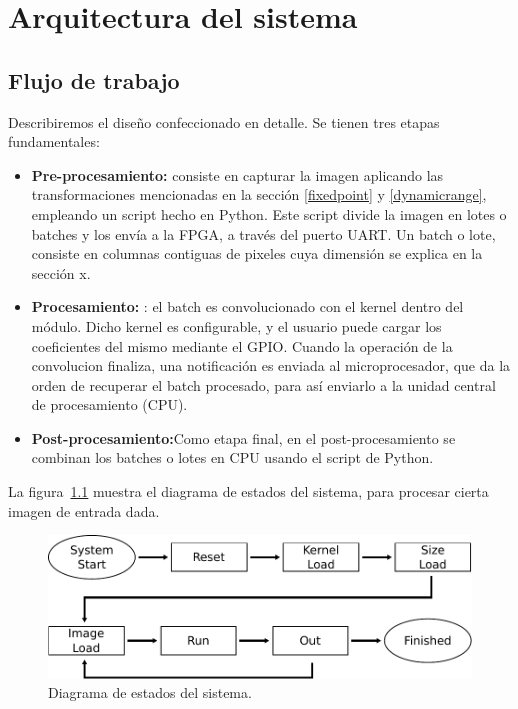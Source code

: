 \chapter{Arquitectura del sistema}  \label{arquitectura_sec}
\section{Flujo de trabajo}  \label{workflow_subsecc}

Describiremos el diseño confeccionado en detalle. Se tienen tres etapas fundamentales:

\begin{itemize}
\item \textbf{Pre-procesamiento:} consiste en capturar la imagen aplicando las
  transformaciones mencionadas en la sección \ref{fixedpoint} y \ref{dynamicrange}, empleando un script hecho en Python. Este script divide la imagen en lotes o batches y los envía a la FPGA, a través del puerto UART. Un batch o lote, consiste en columnas contiguas de pixeles cuya dimensión se explica en la sección x.
\item \textbf{Procesamiento:}	: el batch es convolucionado con el kernel dentro del módulo. Dicho kernel es configurable, y el usuario puede cargar los coeficientes del mismo mediante el GPIO. 
  Cuando la operación de la convolucion finaliza, una notificación es enviada al microprocesador, que da la orden de recuperar el batch procesado, para así enviarlo a la unidad central de procesamiento (CPU).
\item \textbf{Post-procesamiento:}Como etapa final, en el post-procesamiento se combinan los batches o lotes en CPU usando el script de Python.
\end{itemize}


La figura~\ref{statesfig} muestra el diagrama de estados del sistema, para procesar cierta imagen de entrada dada.

\begin{figure}
\centering
\includegraphics[scale=0.7]{states.pdf}
\caption{Diagrama de estados del sistema.}
\label{statesfig}
\end{figure}

